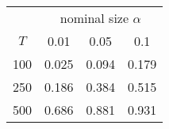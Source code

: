 % 
\begin{tabular}{cccc}
  \hline
  & \multicolumn{3}{c}{nominal size $\alpha$} \\
 $T$ & 0.01 & 0.05 & 0.1 \\
 \hline
100 & 0.025 & 0.094 & 0.179 \\ 
  250 & 0.186 & 0.384 & 0.515 \\ 
  500 & 0.686 & 0.881 & 0.931 \\ 
   \hline
\end{tabular}
